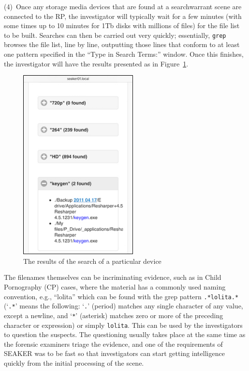 \documentclass[12pt]{article}
\begin{document}
(4)~Once any storage media devices that are found at a \gls{searchwarrant} scene
are connected to the RP, the investigator will typically wait for a
few minutes (with some times up to 10 minutes for 1Tb disks with
millions of files) for the file list to be built. Searches can then
be carried out very quickly; essentially, \verb|grep| browses the file
list, line by line, outputting those lines that conform to at least
one pattern specified in the ``Type in Search Terms:'' window. Once
this finishes, the investigator will have the results presented as in
Figure~\ref{fig:screen-3}.

\begin{figure}[H]
  \begin{center}
  \includegraphics[width=6cm]{images/seaker-hh-screen-3.jpg}
  \caption{The results of the search of a particular device}
  \label{fig:screen-3}
  \end{center}
\end{figure}

The filenames themselves can be incriminating evidence, such as in
Child Pornography (CP) cases, where the material has a commonly used
naming convention, e.g., ``lolita'' which can be found with the grep
pattern \verb|.*lolita.*| (`\verb|.*|' means the
following: `\verb|.|' (period)  matches any single character of any
value, except
a newline, and `\verb|*|' (asterisk) matches zero or more of the
preceding character or expression) or simply \verb|lolita|.
This can be used by the
investigators to question the suspects.  The questioning usually
takes place at the same time as the forensic examiners triage the
evidence, and one of the requirements of SEAKER was to be fast so that
investigators can start getting intelligence quickly from the initial
processing of the scene.\\
\end{document}
